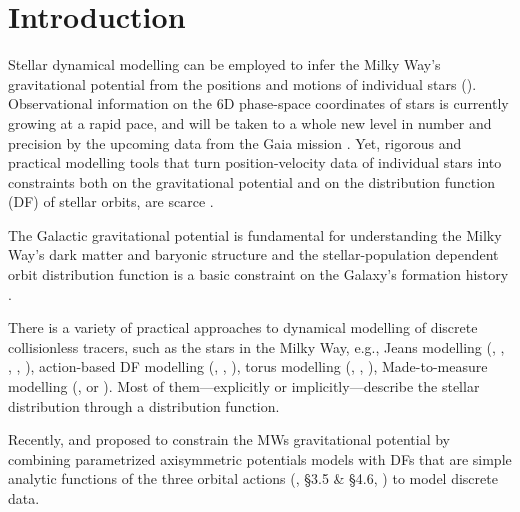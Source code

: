 \section{Introduction} \label{sec:intro}

Stellar dynamical modelling can be employed to infer the Milky Way's gravitational potential from the positions and motions of individual stars (\citealt{2008gady.book.....B,2011Prama..77...39B,2013A&ARv..21...61R}). Observational information on the 6D phase-space coordinates of stars is currently growing at a rapid pace, and will be taken to a whole new level in number and precision by the upcoming data from the Gaia mission \citep{2001A&A...369..339P}. Yet, rigorous and practical modelling tools that turn position-velocity data of individual stars into constraints both on the gravitational potential and on the distribution function (DF) of stellar orbits, are scarce \citep{2013A&ARv..21...61R}.

The Galactic gravitational potential is fundamental for understanding the Milky Way's dark matter and baryonic structure \citep{2013A&ARv..21...61R,2012EPJWC..1910002M,2013PhR...531....1S,2014JPhG...41f3101R} and the stellar-population dependent orbit distribution function is a basic constraint on the Galaxy's formation history \citep{2013NewAR..57...29B,2013A&ARv..21...61R,2015MNRAS.449.3479S}.

There is a variety of practical approaches to dynamical modelling of discrete collisionless tracers, such as the stars in the Milky Way, e.g., Jeans modelling (\citealt{1989MNRAS.239..605K}, \citealt{2012ApJ...756...89B}, \citealt{2012MNRAS.425.1445G}, \citealt{2013ApJ...772..108Z}, \citealt{2015MNRAS.452..956B}), action-based DF modelling (\citealt{2013ApJ...779..115B}, \citealt{2014MNRAS.445.3133P}, \citealt{2015MNRAS.449.3479S}), torus modelling (\citealt{2008MNRAS.390..429M}, \citealt{2012MNRAS.419.2251M}, \citealt{2013MNRAS.433.1411M}), Made-to-measure modelling (\citealt{sye96}, \citealt{2007MNRAS.376...71D} or \citealt{2014MNRAS.443.2112H}). Most of them---explicitly or implicitly---describe the stellar distribution through a distribution function. 

Recently, \citet{2012MNRAS.426.1328B} and \citet{2013ApJ...779..115B}  proposed to constrain the MWs gravitational potential by combining parametrized axisymmetric potentials models with DFs that are simple analytic functions of the three orbital actions (\citealt{2008gady.book.....B}, \S 3.5 \& \S 4.6, \citealt{2011Prama..77...39B}) to model discrete data.



